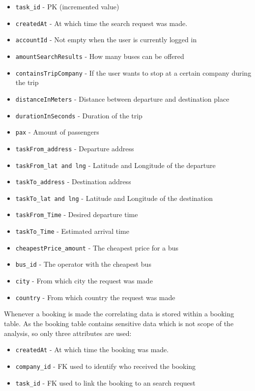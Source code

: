 \begin{itemize}
  \item \verb|task_id| - PK (incremented value) 
  \item \verb|createdAt| - At which time the search request was made.
  \item \verb|accountId| - Not empty when the user is currently logged in
  \item \verb|amountSearchResults| - How many buses can be offered
  \item \verb|containsTripCompany| - If the user wants to stop at a certain company during the trip
  \item \verb|distanceInMeters|  - Distance between departure and destination place
  \item \verb|durationInSeconds| - Duration of the trip
  \item \verb|pax|  - Amount of passengers
  \item \verb|taskFrom_address| - Departure address 
  \item \verb|taskFrom_lat and lng| - Latitude and Longitude of the departure
  \item \verb|taskTo_address|  - Destination address
  \item \verb|taskTo_lat and lng| - Latitude and Longitude of the destination
  \item \verb|taskFrom_Time|  - Desired departure time 
  \item \verb|taskTo_Time|  - Estimated arrival time
  \item \verb|cheapestPrice_amount| - The cheapest price for a bus
  \item \verb|bus_id| - The operator with the cheapest bus
  \item \verb|city| - From which city the request was made
  \item \verb|country| - From which country the request was made
\end{itemize}

Whenever a booking is made the correlating data is stored within a booking table. As the booking table contains sensitive data which is not scope of the analysis, so only three attributes are used: 

\begin{itemize}
	\item \verb|createdAt| - At which time the booking was made.
	\item \verb|company_id| - FK used to identify who received the booking
	\item \verb|task_id| - FK used to link the booking to an search request 
\end{itemize} 

